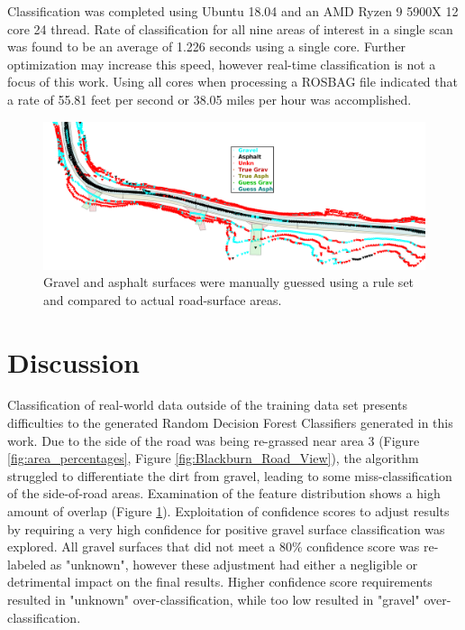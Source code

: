 \documentclass[journal,onecolumn]{IEEEtran}
\begin{document}
	{Classification was completed using Ubuntu 18.04 and an AMD Ryzen 9 5900X 12 core 24 thread. Rate of classification for all nine areas of interest in a single scan was found to be an average of 1.226 seconds using a single core. Further optimization may increase this speed, however real-time classification is not a focus of this work. Using all cores when processing a ROSBAG file indicated that a rate of 55.81 feet per second or 38.05 miles per hour was accomplished.}
	
	\begin{figure}[H]
		\centering
		\includegraphics[width=0.9\linewidth]{figures/rm_db_4_toc}
		\caption[Projected Guess vs Truth]{Gravel and asphalt surfaces were manually guessed using a rule set and compared to actual road-surface areas. }
		\label{fig:rm_db_4_toc}
	\end{figure}

\section{Discussion}

	
	{Classification of real-world data outside of the training data set presents difficulties to the generated Random Decision Forest Classifiers generated in this work. Due to the side of the road was being re-grassed near area $3$ (Figure \ref{fig:area_percentages}, Figure \ref{fig:Blackburn_Road_View}), the algorithm struggled to differentiate the dirt from gravel, leading to some miss-classification of the side-of-road areas. Examination of the feature distribution shows a high amount of overlap (Figure \ref{}). Exploitation of confidence scores to adjust results by requiring a very high confidence for positive gravel surface classification was explored. All gravel surfaces that did not meet a 80\% confidence score was re-labeled as "unknown", however these adjustment had either a negligible or detrimental impact on the final results. Higher confidence score requirements resulted in "unknown" over-classification, while too low resulted in "gravel" over-classification.  }
	
\end{document}
